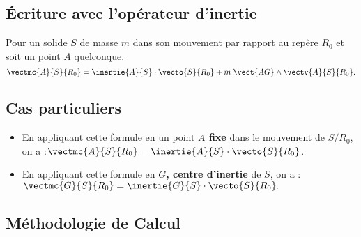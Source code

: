 \subsection{Écriture avec l'opérateur d'inertie}

\begin{prop}
Pour un solide $S$ de masse $m$ dans son mouvement par rapport au repère $R_0$ et soit un point $A$ quelconque.
$$\vectmc{A}{S}{R_0}=\inertie{A}{S}\cdot \vecto{S}{R_0}+m\;\vect{AG}\wedge \vectv{A}{S}{R_0}.
$$
\end{prop}



\subsection{Cas particuliers}

\begin{itemize}
\item En appliquant cette formule en un point \textbf{$A$ fixe} dans le mouvement de $S/R_0$, on a :$\vectmc{A}{S}{R_0}=\inertie{A}{S}\cdot \vecto{S}{R_0}$.
\item En appliquant cette formule en \textbf{$G$, centre d'inertie} de $S$, on a :
$
\vectmc{G}{S}{R_0}=\inertie{G}{S}\cdot \vecto{S}{R_0}.
$
\end{itemize}



\subsection{Méthodologie de Calcul}

